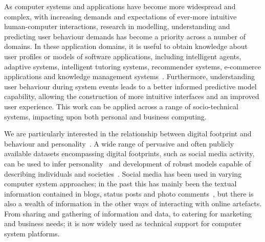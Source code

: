\documentclass[graybox]{svmult}
\begin{document}
As computer systems and applications have become more widespread and
complex, with increasing demands and expectations of ever-more
intuitive human-computer interactions, research in modelling,
understanding and predicting user behaviour demands has become a
priority across a number of domains.  In these application domains, it
is useful to obtain knowledge about user profiles or models of
software applications, including intelligent agents, adaptive systems,
intelligent tutoring systems, recommender systems, e-commerce
applications and knowledge management
systems~\cite{schiaffino+amandi:2009}. Furthermore, understanding user
behaviour during system events leads to a better informed predictive
model capability, allowing the construction of more intuitive
interfaces and an improved user experience. This work can be applied
across a range of socio-technical systems, impacting upon both
personal and business computing.

We are particularly interested in the relationship between digital
footprint and behaviour and personality~\citep{oatley+crick:2014}. A
wide range of pervasive and often publicly available datasets
encompassing digital footprints, such as social media activity, can be
used to infer personality~\citep{lambiotte+kosinski:2014} and
development of robust models capable of describing individuals and
societies~\citep{lazer-et-al:2009}. Social media has been used in
varying computer system approaches; in the past this has mainly been
the textual information contained in blogs, status posts and photo
comments~\cite{blamey-et-al-2012}, but there is also
a wealth of information in the other ways of interacting with online
artefacts. From sharing and gathering of information and data, to
catering for marketing and business needs; it is now widely used as
technical support for computer system platforms.
\end{document}

